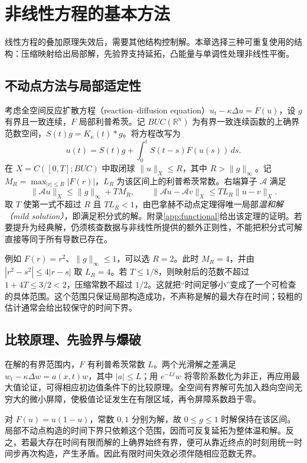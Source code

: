 \setcounter{chapter}{16} %
\chapter{非线性方程的基本方法}
\label{chap:nonlinear}

线性方程的叠加原理失效后，需要其他结构控制解。本章选择三种可重复使用的结构：压缩映射给出局部解，先验界支持延拓，凸能量与单调性处理非线性平衡。

\section{不动点方法与局部适定性}
考虑全空间反应扩散方程（reaction--diffusion equation）$u_t-\kappa\Delta u=F(u)$，设 $g$ 有界且一致连续，$F$ 局部利普希茨。记 $BUC(\mathbb R^n)$ 为有界一致连续函数的上确界范数空间，$S(t)g=K_\kappa(t)*g$。将方程改写为
\begin{equation}
 u(t)=S(t)g+\int_0^tS(t-s)F(u(s))\,ds.
 \label{eq:semilinear-mild}
\end{equation}
在 $X=C([0,T];BUC)$ 中取闭球 $\|u\|_X\le R$，其中 $R>\|g\|_\infty$。记 $M_R=\max_{|r|\le R}|F(r)|$，$L_R$ 为该区间上的利普希茨常数。右端算子 $\mathcal A$ 满足
\[
 \|\mathcal Au\|_X\le\|g\|_\infty+TM_R,\qquad
 \|\mathcal Au-\mathcal Av\|_X\le TL_R\|u-v\|_X.
\]
取 $T$ 使第一式不超过 $R$ 且 $TL_R<1$，由巴拿赫不动点定理得唯一局部\emph{温和解（mild solution）}，即满足积分式的解。附录\ref{app:functional}给出该定理的证明。若要提升为经典解，仍须核查数据与非线性所提供的额外正则性，不能把积分式可解直接等同于所有导数已存在。

例如 $F(r)=r^2$、$\|g\|_\infty\le1$，可以选 $R=2$。此时 $M_R=4$，并由 $|r^2-s^2|\le4|r-s|$ 取 $L_R=4$。若 $T\le1/8$，则映射后的范数不超过 $1+4T\le3/2<2$，压缩常数不超过 $1/2$。这就把“时间足够小”变成了一个可检查的具体范围。这个范围只保证局部构造成功，不声称是解的最大存在时间；较粗的估计通常会给出较保守的时间下界。

\section{比较原理、先验界与爆破}
在解的有界范围内，$F$ 有利普希茨常数 $L$。两个光滑解之差满足 $w_t-\kappa\Delta w=a(x,t)w$，其中 $|a|\le L$；用 $e^{-Lt}w$ 将零阶系数化为非正，再应用最大值论证，可得相应初边值条件下的比较原理。全空间有界解可先加入趋向空间无穷大的微小屏障，使极值论证发生在有限区域，再令屏障系数趋于零。

对 $F(u)=u(1-u)$，常数 $0,1$ 分别为解，故 $0\le g\le1$ 时解保持在该区间。局部不动点构造的时间下界只依赖这个范围，因而可反复延拓为整体温和解。反之，若最大存在时间有限而解的上确界始终有界，便可从靠近终点的时刻用统一时间步再次构造，产生矛盾。因此有限时间失效必须伴随相应范数无界。

